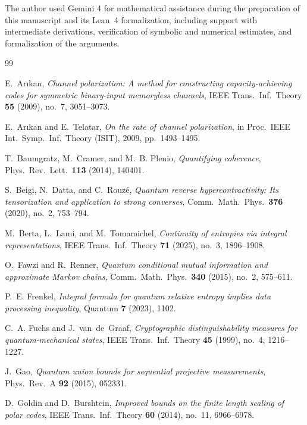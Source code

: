 \documentclass[10pt,a4paper]{article}
\numberwithin{equation}{section}
\theoremstyle{plain}
\theoremstyle{definition}
\theoremstyle{remark}
\begin{document}
The author used Gemini 4 for mathematical assistance during the preparation of this manuscript and its Lean~4 formalization, including support with intermediate derivations, verification of symbolic and numerical estimates, and formalization of the arguments.

\begin{thebibliography}{99}

E.~Ar{\i}kan, \emph{Channel polarization: A method for constructing capacity-achieving codes for symmetric binary-input memoryless channels}, IEEE Trans.\ Inf.\ Theory \textbf{55} (2009), no.~7, 3051--3073.

E.~Ar{\i}kan and E.~Telatar, \emph{On the rate of channel polarization}, in Proc.\ IEEE Int.\ Symp.\ Inf.\ Theory (ISIT), 2009, pp.~1493--1495.

T.~Baumgratz, M.~Cramer, and M.~B. Plenio, \emph{Quantifying coherence}, Phys.\ Rev.\ Lett.\ \textbf{113} (2014), 140401.

S.~Beigi, N.~Datta, and C.~Rouz\'{e}, \emph{Quantum reverse hypercontractivity: Its tensorization and application to strong converses}, Comm.\ Math.\ Phys.\ \textbf{376} (2020), no.~2, 753--794.

M.~Berta, L.~Lami, and M.~Tomamichel, \emph{Continuity of entropies via integral representations}, IEEE Trans.\ Inf.\ Theory \textbf{71} (2025), no.~3, 1896--1908.

O.~Fawzi and R.~Renner, \emph{Quantum conditional mutual information and approximate Markov chains}, Comm.\ Math.\ Phys.\ \textbf{340} (2015), no.~2, 575--611.

P.~E. Frenkel, \emph{Integral formula for quantum relative entropy implies data processing inequality}, Quantum \textbf{7} (2023), 1102.

C.~A. Fuchs and J.~van~de~Graaf, \emph{Cryptographic distinguishability measures for quantum-mechanical states}, IEEE Trans.\ Inf.\ Theory \textbf{45} (1999), no.~4, 1216--1227.

J.~Gao, \emph{Quantum union bounds for sequential projective measurements}, Phys.\ Rev.\ A \textbf{92} (2015), 052331.

D.~Goldin and D.~Burshtein, \emph{Improved bounds on the finite length scaling of polar codes}, IEEE Trans.\ Inf.\ Theory \textbf{60} (2014), no.~11, 6966--6978.


\end{thebibliography}
\end{document}
